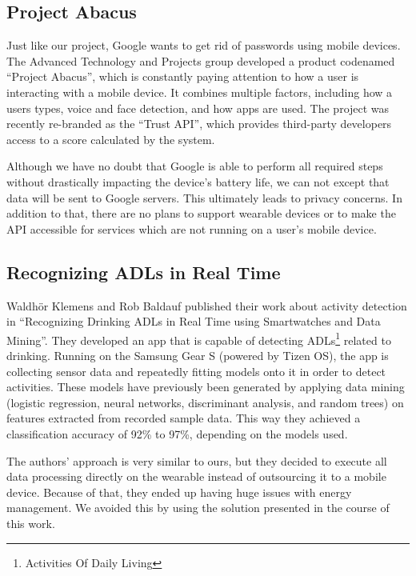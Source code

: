 \clearpage

\subsection{Project Abacus}
Just like our project, Google wants to get rid of passwords using mobile devices.
The Advanced Technology and Projects group developed a product codenamed ``Project Abacus'', which is constantly paying attention to how a user is interacting with a mobile device.
It combines multiple factors, including how a users types, voice and face detection, and how apps are used.
The project was recently re-branded as the ``Trust API'', which provides third-party developers access to a score calculated by the system.

Although we have no doubt that Google is able to perform all required steps without drastically impacting the device's battery life, we can not except that data will be sent to Google servers.
This ultimately leads to privacy concerns.
In addition to that, there are no plans to support wearable devices or to make the API accessible for services which are not running on a user's mobile device.

\subsection{Recognizing ADLs in Real Time}
Waldhör Klemens and Rob Baldauf published their work about activity detection in ``Recognizing Drinking ADLs in Real Time using Smartwatches and Data Mining''\cite{paper:drinkingadls}.
They developed an app that is capable of detecting ADLs\footnote{Activities Of Daily Living} related to drinking.
Running on the Samsung Gear S (powered by Tizen OS), the app is collecting sensor data and repeatedly fitting models onto it in order to detect activities.
These models have previously been generated by applying data mining (logistic regression, neural networks, discriminant analysis, and random trees) on features extracted from recorded sample data. This way they achieved a classification accuracy of 92\% to 97\%, depending on the models used.

The authors' approach is very similar to ours, but they decided to execute all data processing directly on the wearable instead of outsourcing it to a mobile device.
Because of that, they ended up having huge issues with energy management. We avoided this by using the solution presented in the course of this work.

\clearpage